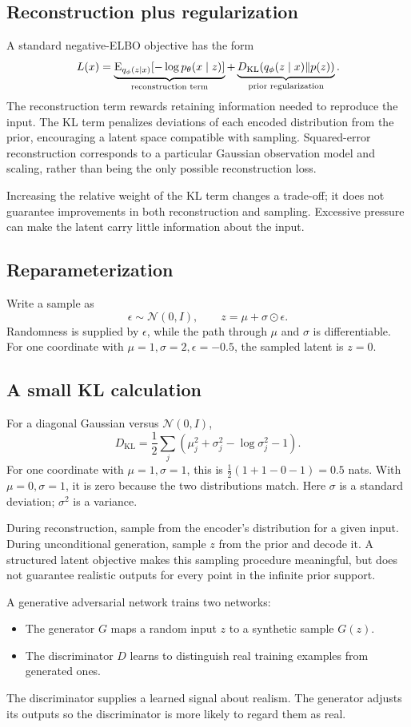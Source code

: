 \documentclass[11pt]{article}
\begin{document}
\subsection{Reconstruction plus regularization}
A standard negative-ELBO objective has the form
\[
L(x)=
\underbrace{\operatorname{E}_{q_\phi(z\mid x)}[-\log p_\theta(x\mid z)]}_{\text{reconstruction term}}
+\underbrace{D_{\mathrm{KL}}(q_\phi(z\mid x)\|p(z))}_{\text{prior regularization}}.
\]
The reconstruction term rewards retaining information needed to reproduce the input. The KL term penalizes deviations of each encoded distribution from the prior, encouraging a latent space compatible with sampling. Squared-error reconstruction corresponds to a particular Gaussian observation model and scaling, rather than being the only possible reconstruction loss.

Increasing the relative weight of the KL term changes a trade-off; it does not guarantee improvements in both reconstruction and sampling. Excessive pressure can make the latent carry little information about the input.

\subsection{Reparameterization}
Write a sample as
\[
\epsilon\sim\mathcal N(0,I),\qquad z=\mu+\sigma\odot\epsilon.
\]
Randomness is supplied by $\epsilon$, while the path through $\mu$ and $\sigma$ is differentiable. For one coordinate with $\mu=1,\sigma=2,\epsilon=-0.5$, the sampled latent is $z=0$.

\subsection{A small KL calculation}
For a diagonal Gaussian versus $\mathcal N(0,I)$,
\[
D_{\mathrm{KL}}=\frac12\sum_j
\left(\mu_j^2+\sigma_j^2-\log\sigma_j^2-1\right).
\]
For one coordinate with $\mu=1,\sigma=1$, this is $\tfrac12(1+1-0-1)=0.5$ nats. With $\mu=0,\sigma=1$, it is zero because the two distributions match. Here $\sigma$ is a standard deviation; $\sigma^2$ is a variance.

During reconstruction, sample from the encoder's distribution for a given input. During unconditional generation, sample $z$ from the prior and decode it. A structured latent objective makes this sampling procedure meaningful, but does not guarantee realistic outputs for every point in the infinite prior support.

A generative adversarial network trains two networks:
\begin{itemize}
\item The generator $G$ maps a random input $z$ to a synthetic sample $G(z)$.
\item The discriminator $D$ learns to distinguish real training examples from generated ones.
\end{itemize}
The discriminator supplies a learned signal about realism. The generator adjusts its outputs so the discriminator is more likely to regard them as real.
\end{document}
